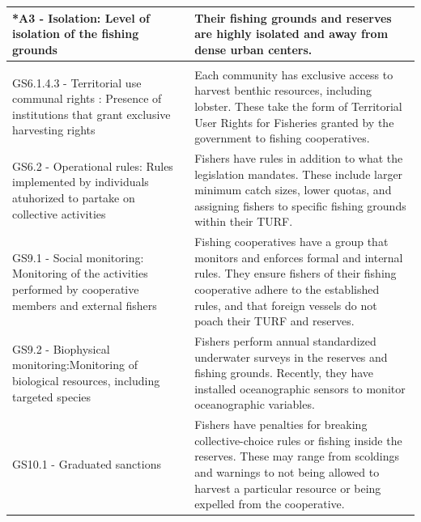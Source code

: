 \documentclass{frontiersSCNS}
\theoremstyle{definition}
\theoremstyle{definition}
\theoremstyle{definition}
\theoremstyle{remark}
\begin{document}
\begin{table}[H]
{\begin{tabular}[t]{>{\raggedright\arraybackslash}p{6.5cm}|>{\raggedright\arraybackslash}p{12cm}}
\hline
\hspace{1em}*A3 - Isolation: Level of isolation of the fishing grounds & Their fishing grounds and reserves are highly isolated and away from dense urban centers.\\
\hline
\multicolumn{2}{l}{\textbf{Governance system (G)}}\\
\hline
\hspace{1em}GS6.1.4.3 - Territorial use communal rights : Presence of institutions that grant exclusive harvesting rights & Each community has exclusive access to harvest benthic resources, including lobster. These take the form of Territorial User Rights for Fisheries granted by the government to fishing cooperatives.\\
\hline
\hspace{1em}GS6.2 - Operational rules: Rules implemented by individuals atuhorized to partake on collective activities & Fishers have rules in addition to what the legislation mandates. These include larger minimum catch sizes, lower quotas, and assigning fishers to specific fishing grounds within their TURF.\\
\hline
\hspace{1em}GS9.1 - Social monitoring: Monitoring of the activities performed by cooperative members and external fishers & Fishing cooperatives have a group that monitors and enforces formal and internal rules. They ensure fishers of their fishing cooperative adhere to the established rules, and that foreign vessels do not poach their TURF and reserves.\\
\hline
\hspace{1em}GS9.2 - Biophysical monitoring:Monitoring of biological resources, including targeted species & Fishers perform annual standardized underwater surveys in the reserves and fishing grounds. Recently, they have installed oceanographic sensors to monitor oceanographic variables.\\
\hline
GS10.1 - Graduated sanctions & Fishers have penalties for breaking collective-choice rules or fishing inside the reserves. These may range from scoldings and warnings to not being allowed to harvest a particular resource or being expelled from the cooperative.\\
\hline
\end{tabular}}
\end{table}
\end{document}
